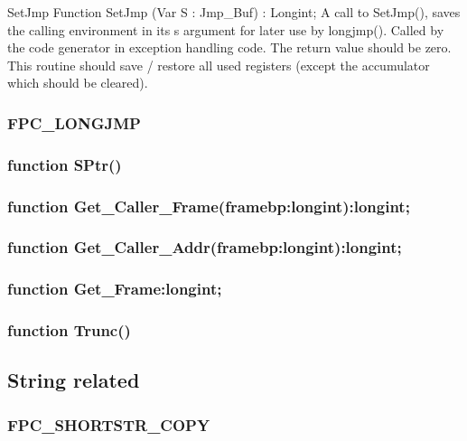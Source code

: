 \documentclass [a4paper,12pt]{article}
\begin{document}
\begin{function}{SetJmp}
\Declaration
Function SetJmp (Var S : Jmp{\_}Buf) : Longint;
\Description
A call to SetJmp(), saves the calling environment in its \textsf{s} argument
for later use by \textsf{longjmp()}. Called by the code generator in
exception handling code. The return value should be zero.
\Notes
This routine should save / restore all used registers (except the
accumulator which should be cleared).
\end{function}

\subsubsection{FPC{\_}LONGJMP}
\label{subsubsec:mylabel31}

\subsubsection{function SPtr()}
\label{subsubsec:function}

\subsubsection{function Get{\_}Caller{\_}Frame(framebp:longint):longint;}
\label{subsubsec:mylabel32}

\subsubsection{function Get{\_}Caller{\_}Addr(framebp:longint):longint;}
\label{subsubsec:mylabel33}

\subsubsection{function Get{\_}Frame:longint;}
\label{subsubsec:mylabel34}

\subsubsection{function Trunc()}
\label{subsubsec:mylabel35}

\subsection{String related}
\label{subsec:string}

\subsubsection{FPC{\_}SHORTSTR{\_}COPY}
\label{subsubsec:mylabel36}
\end{document}
